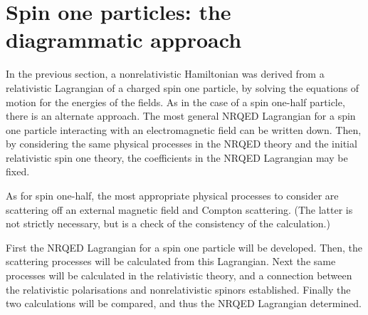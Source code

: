 %  


% 
% 
% 
% 
% 
\chapter{Spin one particles: the diagrammatic approach}

In the previous section, a nonrelativistic Hamiltonian was derived from a relativistic Lagrangian of a charged spin one particle, by solving the equations of motion for the energies of the fields.  As in the case of a spin one-half particle, there is an alternate approach.  The most general NRQED Lagrangian for a spin one particle interacting with an electromagnetic field can be written down.  Then, by considering the same physical processes in the NRQED theory and the initial relativistic spin one theory, the coefficients in the NRQED Lagrangian may be fixed.

As for spin one-half, the most appropriate physical processes to consider are scattering off an external magnetic field and Compton scattering.  (The latter is not strictly necessary, but is a check of the consistency of the calculation.)

First the NRQED Lagrangian for a spin one particle will be developed.  Then, the scattering processes will be calculated from this Lagrangian.  Next the same processes will be calculated in the relativistic theory, and a connection between the relativistic polarisations and nonrelativistic spinors established.  Finally the two calculations will be compared, and thus the NRQED Lagrangian determined.  

